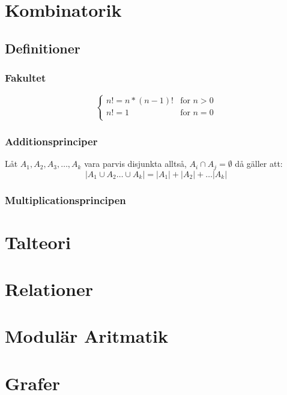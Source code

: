 \documentclass{article}
\begin{document}
	\section{Kombinatorik}
	\subsection{Definitioner}
	\subsubsection{Fakultet}
	$$
	\begin{cases}
		n! = n * (n - 1)! & \text{for }n > 0\\    
		n! = 1 & \text{for } n = 0\\
	\end{cases}
	$$
	\subsubsection{Additionsprinciper}
	Låt $A_1, A_2, A_3, \dots ,A_k$ vara parvis disjunkta alltså, $A_i \cap A_j = \emptyset$ då gäller att:
	$$
		|A_1 \cup A_2 \dots \cup A_k| = |A_1| + |A_2| + \dots |A_k|
	$$
	\subsubsection{Multiplicationsprincipen}


	\section{Talteori}

	\section{Relationer}

	\section{Modulär Aritmatik}

	\section{Grafer}
\end{document}
